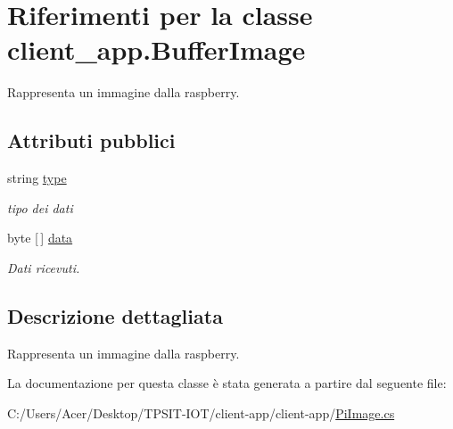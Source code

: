 \hypertarget{classclient__app_1_1_buffer_image}{}\section{Riferimenti per la classe client\+\_\+app.\+Buffer\+Image}
\label{classclient__app_1_1_buffer_image}


Rappresenta un immagine dalla raspberry.  


\subsection*{Attributi pubblici}
\begin{DoxyCompactItemize}
\item 
\mbox{\label{classclient__app_1_1_buffer_image_a18bbeee91118a157b36781b24446f04a}} 
string \mbox{\hyperlink{classclient__app_1_1_buffer_image_a18bbeee91118a157b36781b24446f04a}{type}}
\begin{DoxyCompactList}\small\item\em tipo dei dati \end{DoxyCompactList}\item 
\mbox{\label{classclient__app_1_1_buffer_image_a317894857771a65202bb7a1482ad44f9}} 
byte \mbox{[}$\,$\mbox{]} \mbox{\hyperlink{classclient__app_1_1_buffer_image_a317894857771a65202bb7a1482ad44f9}{data}}
\begin{DoxyCompactList}\small\item\em Dati ricevuti. \end{DoxyCompactList}\end{DoxyCompactItemize}


\subsection{Descrizione dettagliata}
Rappresenta un immagine dalla raspberry. 

La documentazione per questa classe è stata generata a partire dal seguente file\+:\begin{DoxyCompactItemize}
\item 
C\+:/\+Users/\+Acer/\+Desktop/\+T\+P\+S\+I\+T-\/\+I\+O\+T/client-\/app/client-\/app/\mbox{\hyperlink{_pi_image_8cs}{Pi\+Image.\+cs}}\end{DoxyCompactItemize}
